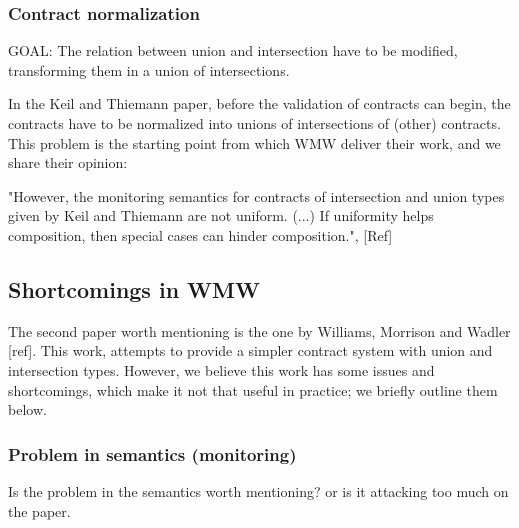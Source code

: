 

\subsubsection{Contract normalization}

GOAL: The relation between union and intersection have to be modified, transforming them
in a union of intersections.

In the Keil and Thiemann paper, before the validation of contracts can begin, the
contracts have to be normalized into unions of intersections of (other) contracts.
This problem  is the starting point from which
WMW deliver their work, and we share their opinion:

"However, the monitoring semantics for contracts of intersection and union types given by Keil
and Thiemann are not uniform. (...) If uniformity helps composition, then
special cases can hinder composition.", [Ref]

\subsection{Shortcomings in WMW}

The second paper worth mentioning is the one by Williams, Morrison and Wadler [ref].
This work, attempts to provide a simpler contract system with
union and intersection types.
However, we believe this work has some issues and shortcomings, which make it
not that useful in practice; we briefly outline them below.



\subsubsection*{Problem in semantics (monitoring)}
Is the problem in the semantics worth mentioning? or is it attacking
too much on the paper.
